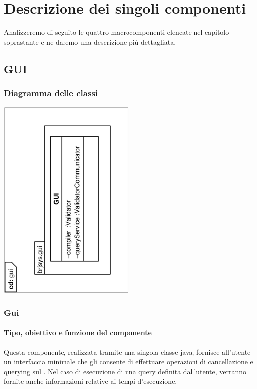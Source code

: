 \documentclass[11pt,titlepage,a4paper]{report}
\begin{document}
\chapter{Descrizione dei singoli componenti}
Analizzeremo di seguito le quattro macrocomponenti elencate nel capitolo soprastante e ne daremo una descrizione pi\`u dettagliata.

\section{GUI}
\subsection{Diagramma delle classi}
\begin{center}
\includegraphics[width=0.5\textwidth, angle=-90]{DiagrammaClassi/gui.eps}
\end{center}
\subsection{Gui}
\subsubsection{Tipo, obiettivo e funzione del componente}
Questa componente, realizzata tramite una singola classe java, fornisce all'utente un interfaccia minimale che gli consente di effettuare operazioni di cancellazione e querying sul \re. Nel caso di esecuzione di una query definita dall'utente, verranno fornite anche informazioni relative ai tempi d'esecuzione.
\end{document}
